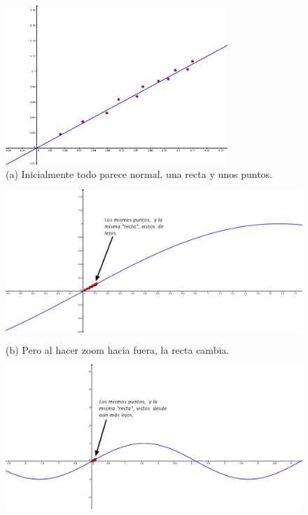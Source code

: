 
\begin{figure}[p]
\begin{center}
\begin{enColor}
\includegraphics[height=6cm]{../fig/Cap10-EjemploRegresion02a.png}\\
(a) Inicialmente todo parece normal, una recta y unos puntos.\\
\includegraphics[height=6cm]{../fig/Cap10-EjemploRegresion02b.png}\\
(b) Pero al hacer zoom hacia fuera, la recta cambia.
\includegraphics[height=6cm]{../fig/Cap10-EjemploRegresion02c.png}\\

\end{enColor}
\end{center}
\end{figure}
